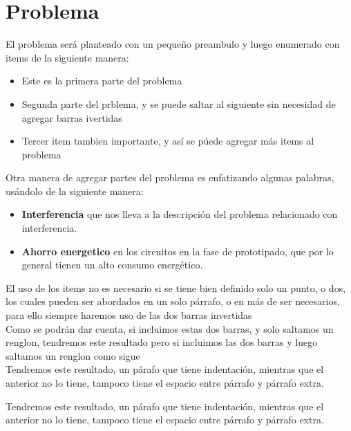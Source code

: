 \documentclass[a4paper]{IEEEtran} %
\begin{document}
\section{Problema}
\label{problema} %

El problema será planteado con un pequeño preambulo y luego enumerado con items de la siguiente manera:

    \begin{itemize}
    	\item Este es la primera parte del problema
    	\item Segunda parte del prblema, y se puede saltar al siguiente sin necesidad de agregar barras ivertidas %
		\item Tercer item tambien importante, y así se púede agregar más items al problema
	\end{itemize}

	Otra manera de agregar partes del problema es enfatizando algunas palabras, usándolo de la siguiente manera:

	\begin{itemize}
		\item \textbf{Interferencia} que nos lleva a la descripción del problema relacionado con interferencia.
		\item \textbf{Ahorro energetico} en los circuitos en la fase de prototipado, que por lo general tienen un alto consumo energético.
	\end{itemize}

El uso de los items no es necesario si se tiene bien definido solo un punto, o dos, los cuales pueden ser abordados en un solo párrafo, o en más de ser necesarios, para ello siempre haremos uso de las dos barras invertidas\\ %
Como se podrán dar cuenta, si incluimos estas dos barras, y solo saltamos un renglon, tendremos este resultado pero si incluimos las dos barras y luego saltamos un renglon como sigue \\

Tendremos este resultado, un párafo que tiene indentación, mientras que el anterior no lo tiene, tampoco tiene el espacio entre párrafo y párrafo extra.

Tendremos este resultado, un párafo que tiene indentación, mientras que el anterior no lo tiene, tampoco tiene el espacio entre párrafo y párrafo extra.
\end{document}
